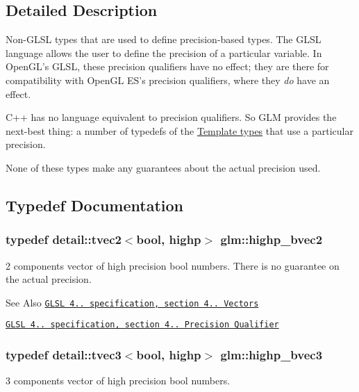 \subsection{Detailed Description}
Non-\/\-G\-L\-S\-L types that are used to define precision-\/based types. The G\-L\-S\-L language allows the user to define the precision of a particular variable. In Open\-G\-L's G\-L\-S\-L, these precision qualifiers have no effect; they are there for compatibility with Open\-G\-L E\-S's precision qualifiers, where they {\itshape do} have an effect.

C++ has no language equivalent to precision qualifiers. So G\-L\-M provides the next-\/best thing\-: a number of typedefs of the \hyperlink{group__core__template}{Template types} that use a particular precision.

None of these types make any guarantees about the actual precision used. 

\subsection{Typedef Documentation}
\hypertarget{group__core__precision_ga4153415d1f3d390219ac9464652ac377}{
\subsubsection[{highp\-\_\-bvec2}]{\setlength{\rightskip}{0pt plus 5cm}typedef detail\-::tvec2$<$bool, highp$>$ {\bf glm\-::highp\-\_\-bvec2}}}\label{group__core__precision_ga4153415d1f3d390219ac9464652ac377}
2 components vector of high precision bool numbers. There is no guarantee on the actual precision.

\begin{DoxySeeAlso}{See Also}
\href{http://www.opengl.org/registry/doc/GLSLangSpec.4.20.8.pdf}{\tt G\-L\-S\-L 4.. specification, section 4.. Vectors} 

\href{http://www.opengl.org/registry/doc/GLSLangSpec.4.20.8.pdf}{\tt G\-L\-S\-L 4.. specification, section 4.. Precision Qualifier} 
\end{DoxySeeAlso}
\hypertarget{group__core__precision_ga1d77a773fdd024602413670788c10c62}{
\subsubsection[{highp\-\_\-bvec3}]{\setlength{\rightskip}{0pt plus 5cm}typedef detail\-::tvec3$<$bool, highp$>$ {\bf glm\-::highp\-\_\-bvec3}}}\label{group__core__precision_ga1d77a773fdd024602413670788c10c62}
3 components vector of high precision bool numbers.

